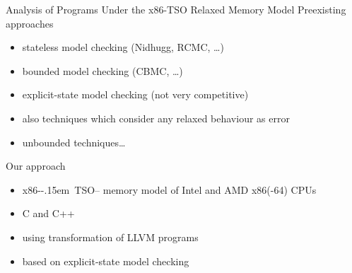 \documentclass[aspectratio=169, fi]{paradise-slide}
\newcommand{\xtso}{\mbox{x86-\kern-.15em TSO}\xspace}
\begin{document}
\begin{frame}{Analysis of Programs Under the x86-TSO Relaxed Memory Model}
  Preexisting approaches
  \begin{itemize}
    \item stateless model checking (Nidhugg, RCMC, …)
    \item bounded model checking (CBMC, …)
    \item explicit-state model checking (not very competitive)
    \item also techniques which consider any relaxed behaviour as error
    \item unbounded techniques…
  \end{itemize}
  \pause

  \bigskip
  Our approach
  \begin{itemize}
    \item \xtso – memory model of Intel and AMD x86(-64) CPUs
    \item C and C++
    \item using transformation of LLVM programs
    \item based on explicit-state model checking
  \end{itemize}
\end{frame}
\end{document}
